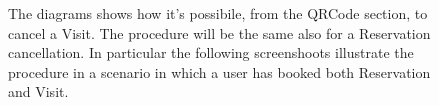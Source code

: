 \begin{figure}[H]
  \label{QRCode_handle2}
  
  \centering
   \caption{The diagrams shows how it's possibile, from the QRCode section, to cancel a Visit. The procedure will be the same also for a Reservation cancellation. In particular the following screenshoots illustrate the procedure in a scenario in which a user has booked both Reservation and Visit.} 
\end{figure}



